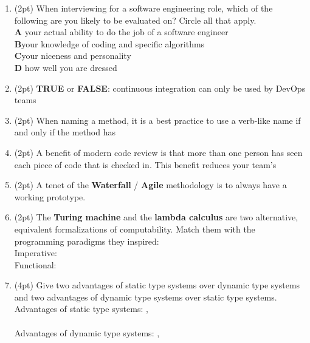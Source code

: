 \documentclass{report}
\newif\ifkey
\newcommand{\correct}[1]{\ifkey\color{red}\textbf{#1}\color{black}\else\textbf{#1}\fi\xspace}
\newcommand{\answershort}[1]{\ifkey\color{red}\underline{\textbf{#1}}\color{black}\else\underline{\hspace{3in}}\fi\xspace}
\newcommand*{\pts}[1]{\addtocounter{points}{#1}(#1pt)}
\begin{document}
\begin{spacing}{1.4}
\begin{enumerate}[leftmargin=*]
\item \pts{2}
  When interviewing for a software engineering role, which of the following are you likely to be evaluated on? Circle all that apply.
  \\ \textbf{A}\hspace{0.2in} your actual ability to do the job of a software engineer
  \\ \correct{B}\hspace{0.2in}your knowledge of coding and specific algorithms
  \\ \correct{C}\hspace{0.2in}your niceness and personality
  \\ \textbf{D}\hspace{0.2in} how well you are dressed
  
\item \pts{2}
  \textbf{TRUE} or \correct{FALSE}: continuous integration can only be used by DevOps teams

\item \pts{2}
  When naming a method, it is a best practice to use a verb-like name if and only if the method has \answershort{side-effects}

\item \pts{2}
  A benefit of modern code review is that more than one person has seen each piece of code that is checked in. This benefit
  reduces your team's \answershort{bus factor}

\item \pts{2}
  A tenet of the \textbf{Waterfall} / \correct{Agile} methodology is to always have a working prototype.

\item \pts{2}
  The \textbf{Turing machine} and the \textbf{lambda calculus} are two alternative, equivalent formalizations of computability.
  Match them with the programming paradigms they inspired: \\
  Imperative: \answershort{Turing machine} \\
  Functional: \answershort{lambda calculus}

\item \pts{4} Give two advantages of static type systems over dynamic type systems and two advantages of dynamic type systems over
  static type systems. \\
  Advantages of static type systems: \answershort{early detection of errors},\\ \answershort{types are documentation} \\
  Advantages of dynamic type systems: \answershort{faster prototyping},\\ \answershort{no false positives}


\end{enumerate}
\end{spacing}
\end{document}
